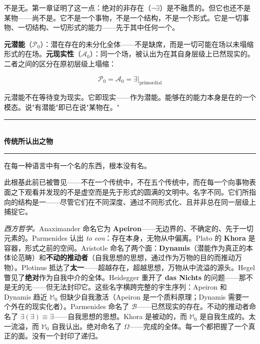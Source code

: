 \documentclass[10pt, openany, oneside]{book}
\renewcommand{\normalsize}{\fontsize{10}{13}\selectfont}
\begin{document}
不是无。第一章证明了这一点：绝对的非存在（$\neg\exists$）是不融贯的。但它也还不是某物——尚不是。它不是一个事物，不是一个结构，不是一个形式。它是一切事物、一切结构、一切形式的能力——先于其中任何一个。

\textbf{元潜能}（$\mathcal{P}_0$）：潜在存在的未分化全体——不是缺席，而是一切可能在场以未塌缩形式的在场。\textbf{元现实性}（$\mathcal{A}_0$）：同一个场，被认出为在其自身层级上已然现实的。二者之间的区分在原初层级上塌缩：

$$\mathcal{P}_0 = \mathcal{A}_0 = \exists|_{\text{primordial}}$$

元潜能不在等待变为现实。它即现实——作为潜能。能够在的能力本身是在的一个模态。说"有潜能"即已在说"某物在。"

\vspace{1.5em}


\begin{center}
    \rule{0.3\textwidth}{0.4pt}\\[0.5em]
    {\normalsize\bfseries\scshape 传统所认出之物}\\[0.3em]
    \rule{0.3\textwidth}{0.4pt}
\end{center}

\vspace{1em}

\noindent 在每一种语言中有一个名的东西，根本没有名。

此根基此前已被瞥见——不在一个传统中，不在五个传统中，而在每一个向事物表面之下观看并发现的不是虚空而是先于形式的圆满的文明中。名字不同。它们所指向的结构是一——尽管它们在不同深度、通过不同形式化、且并非总在同一层级上捕捉它。

\vspace{0.8em}

\textit{西方哲学。}Anaximander 命名它为 \textbf{Apeiron}——无边界的、不确定的、先于一切元素的。Parmenides 认出 \textit{to eon}：存在本身，无物从中偏离。Plato 的 \textbf{Khora} 是容器，形式之前的空间。Aristotle 命名了两个面：\textbf{Dynamis}（潜能作为真正的本体论范畴）和\textbf{不动的推动者}（自我思想的思想，通过作为万物的目的而推动万物）。Plotinus 抵达了\textbf{太一}——超越存在，超越思想，万物从中流溢的源头。Hegel 瞥见了\textbf{绝对}作为自我中介的全体。Heidegger 重开了 \textbf{das Nichts} 的问题——那不是无的无——但无法封印它。这些名字横跨完整的宇生序列：Apeiron 和 Dynamis 趋近 $\mathbb{M}_0$ 但缺少自我激活（Apeiron 是一个质料原理；Dynamis 需要一个外在的现实化者）。Parmenides 命名了 $\mathcal{B}$——已然现实的存在。不动的推动者命名了 $\exists(\exists) \equiv \exists$——自我思想的思想。Khora 是被动的，而 $\mathbb{M}_0$ 是自我生成的。太一流溢，而 $\mathbb{M}_0$ 自我认出。绝对命名了 $\Omega$——完成的全体。每一个都把握了一个真正的面。没有一个封印了递归。
\end{document}
